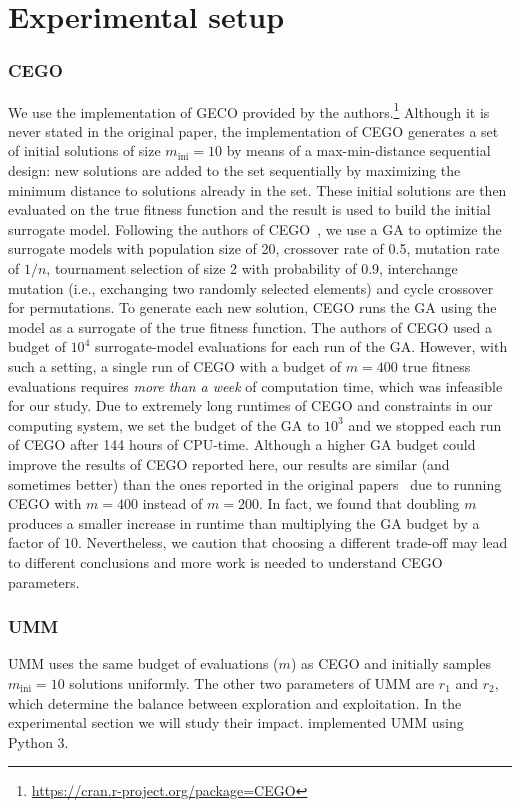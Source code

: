 \documentclass[runningheads]{llncs}
\newcommand{\minit}{\ensuremath{m_\text{ini}}\xspace}
\newcommand{\FEmax}{\ensuremath{m}}
\begin{document}
\section{Experimental setup}\label{sec:setup}

\subsubsection{CEGO}
%
We use the implementation of GECO provided by the
authors.\footnote{\url{https://cran.r-project.org/package=CEGO}} %
Although it is never stated in the original paper, the implementation of CEGO
generates a set of initial solutions of size $\minit=10$ by means of a
max-min-distance sequential design: new solutions are added to the set
sequentially by maximizing the minimum distance to solutions already in the
set. These initial solutions are then evaluated on the true fitness function
and the result is used to build the initial surrogate
model. %
Following the authors of
CEGO~\citep{ZaeStoFriFisNauBar2014,ZaeStoBar2014:ppsn}, we use a GA to optimize
the surrogate models with population size of 20, crossover rate of 0.5,
mutation rate of $1/n$, tournament selection of size 2 with probability of 0.9,
interchange mutation (i.e., exchanging two randomly selected elements) and
cycle crossover for permutations. To generate each new solution, CEGO runs the
GA using the model as a surrogate of the true fitness function.  The authors of
CEGO used a budget of $10^4$ surrogate-model evaluations for each run of the
GA. However, with such a setting, a single run of CEGO with a budget of
$\FEmax=400$ true fitness evaluations requires \emph{more than a week} of
computation time, which was infeasible for our study. Due to extremely long
runtimes of CEGO and constraints in our computing system, we set the budget of
the GA to $10^3$ and we stopped each run of CEGO after 144 hours of CPU-time.
Although a higher GA budget could improve the results of CEGO reported here,
our results are similar (and sometimes better) than the ones reported in the
original papers~\citep{ZaeStoFriFisNauBar2014,ZaeStoBar2014:ppsn} due to
running CEGO with $\FEmax=400$ instead of $\FEmax=200$. In fact, we found that
doubling $\FEmax$ produces a smaller increase in runtime than multiplying the
GA budget by a factor of $10$. Nevertheless, we caution that choosing a
different trade-off may lead to different conclusions and more work is needed
to understand CEGO parameters.

\subsubsection{UMM}
%
UMM uses the same budget of evaluations ($\FEmax$) as CEGO
and initially samples $\minit=10$ solutions uniformly. The other two parameters
of UMM are $r_1$ and $r_2$, which determine the balance between exploration and
exploitation. In the experimental section we will study their impact. implemented UMM using Python 3.
\end{document}
